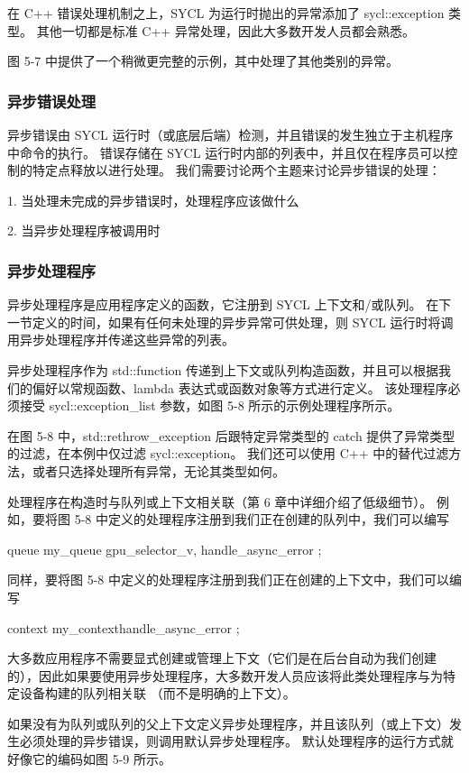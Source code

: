 在 C++ 错误处理机制之上，SYCL 为运行时抛出的异常添加了 sycl::exception 类型。 其他一切都是标准 C++ 异常处理，因此大多数开发人员都会熟悉。

图 5-7 中提供了一个稍微更完整的示例，其中处理了其他类别的异常。

\subsubsection{异步错误处理}
异步错误由 SYCL 运行时（或底层后端）检测，并且错误的发生独立于主机程序中命令的执行。 错误存储在 SYCL 运行时内部的列表中，并且仅在程序员可以控制的特定点释放以进行处理。 我们需要讨论两个主题来讨论异步错误的处理：

1. 当处理未完成的异步错误时，处理程序应该做什么

2. 当异步处理程序被调用时

\subsubsection{异步处理程序}
异步处理程序是应用程序定义的函数，它注册到 SYCL 上下文和/或队列。 在下一节定义的时间，如果有任何未处理的异步异常可供处理，则 SYCL 运行时将调用异步处理程序并传递这些异常的列表。

异步处理程序作为 std::function 传递到上下文或队列构造函数，并且可以根据我们的偏好以常规函数、lambda 表达式或函数对象等方式进行定义。 该处理程序必须接受 sycl::exception\_list 参数，如图 5-8 所示的示例处理程序所示。

在图 5-8 中，std::rethrow\_exception 后跟特定异常类型的 catch 提供了异常类型的过滤，在本例中仅过滤 sycl::exception。 我们还可以使用 C++ 中的替代过滤方法，或者只选择处理所有异常，无论其类型如何。

处理程序在构造时与队列或上下文相关联（第 6 章中详细介绍了低级细节）。 例如，要将图 5-8 中定义的处理程序注册到我们正在创建的队列中，我们可以编写

queue my\_queue{ gpu\_selector\_v, handle\_async\_error };

同样，要将图 5-8 中定义的处理程序注册到我们正在创建的上下文中，我们可以编写

context my\_context{handle\_async\_error };

大多数应用程序不需要显式创建或管理上下文（它们是在后台自动为我们创建的），因此如果要使用异步处理程序，大多数开发人员应该将此类处理程序与为特定设备构建的队列相关联 （而不是明确的上下文）。

如果没有为队列或队列的父上下文定义异步处理程序，并且该队列（或上下文）发生必须处理的异步错误，则调用默认异步处理程序。 默认处理程序的运行方式就好像它的编码如图 5-9 所示。

